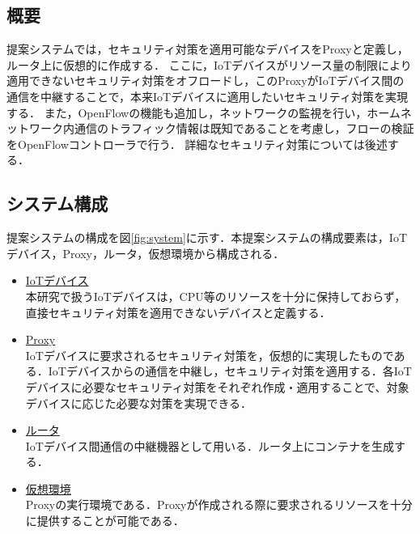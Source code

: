 \documentclass[Japanese]{dicomopapers}
\begin{document}
\subsection{概要}
提案システムでは，セキュリティ対策を適用可能なデバイスをProxyと定義し，ルータ上に仮想的に作成する．
ここに，IoTデバイスがリソース量の制限により適用できないセキュリティ対策をオフロードし，このProxyがIoTデバイス間の通信を中継することで，本来IoTデバイスに適用したいセキュリティ対策を実現する．
また，OpenFlowの機能も追加し，ネットワークの監視を行い，ホームネットワーク内通信のトラフィック情報は既知であることを考慮し，フローの検証をOpenFlowコントローラで行う．
詳細なセキュリティ対策については後述する．


\subsection{システム構成}
提案システムの構成を図\ref{fig:system}に示す．本提案システムの構成要素は，IoTデバイス，Proxy，ルータ，仮想環境から構成される．
\begin{itemize}
	\item \underline{IoTデバイス}\mbox{}\\
	      本研究で扱うIoTデバイスは，CPU等のリソースを十分に保持しておらず，直接セキュリティ対策を適用できないデバイスと定義する．
	\item \underline{Proxy}\mbox{}\\
	      IoTデバイスに要求されるセキュリティ対策を，仮想的に実現したものである．IoTデバイスからの通信を中継し，セキュリティ対策を適用する．各IoTデバイスに必要なセキュリティ対策をそれぞれ作成・適用することで、対象デバイスに応じた必要な対策を実現できる．
	\item \underline{ルータ}\mbox{}\\
	      IoTデバイス間通信の中継機器として用いる．ルータ上にコンテナを生成する．
	\item \underline{仮想環境}\mbox{}\\
	      Proxyの実行環境である．Proxyが作成される際に要求されるリソースを十分に提供することが可能である．
\end{itemize}
\end{document}
